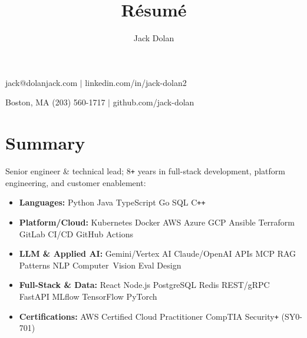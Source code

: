 \documentclass[10pt]{extarticle}
\makeatletter
\renewcommand{\maketitle}{ 
{\huge\bfseries\theauthor}\hfill jack@dolanjack.com $|$ linkedin.com/in/jack-dolan2

\vspace{0.2em} 

Boston, MA \hfill (203) 560-1717 $|$ github.com/jack-dolan
}
\makeatother
\begin{document}
 
\title{R\'esum\'e} 
\author{Jack Dolan} 
\maketitle
{}


\section{Summary}
\hspace*{-0.4cm}Senior engineer \& technical lead; 8\verb!+! years in full-stack development, platform engineering, and customer enablement:
    \begin{itemize}
    \itemsep0em
    \item \textbf{Languages:} Python \text{\textbar} Java \text{\textbar} TypeScript \text{\textbar} Go \text{\textbar} SQL \text{\textbar} C\verb!++!
    \item \textbf{Platform/Cloud:} Kubernetes \text{\textbar} Docker \text{\textbar} AWS \text{\textbar} Azure \text{\textbar} GCP \text{\textbar} Ansible \text{\textbar} Terraform \text{\textbar} GitLab CI/CD \text{\textbar} GitHub Actions
    \item \textbf{LLM \& Applied AI:} Gemini/Vertex AI \text{\textbar} Claude/OpenAI APIs \text{\textbar} MCP \text{\textbar} RAG Patterns \text{\textbar} NLP \text{\textbar} Computer~Vision \text{\textbar} Eval Design
    \item \textbf{Full-Stack \& Data:} React \text{\textbar} Node.js \text{\textbar} PostgreSQL \text{\textbar} Redis \text{\textbar} REST/gRPC \text{\textbar} FastAPI \text{\textbar} MLflow \text{\textbar} TensorFlow \text{\textbar} PyTorch
    \item \textbf{Certifications:} AWS Certified Cloud Practitioner \text{\textbar} CompTIA Security\verb!+! (SY0-701) \end{itemize}  

\end{document}
